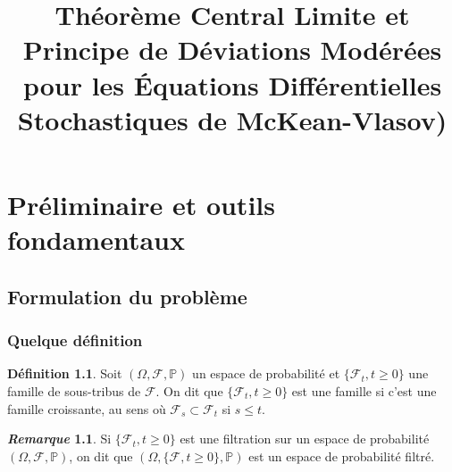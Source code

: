 \documentclass[12pt,a4paper,twoside]{book}%
\title{ \textbf{Théorème Central Limite et Principe de Déviations Modérées pour les Équations Différentielles Stochastiques de McKean-Vlasov)}}
\theoremstyle{definition}
\newtheorem{dfn}{Définition}[section]
\newtheorem{rem}{\textit{Remarque}}[section]
\numberwithin{equation}{section}
\begin{document}
	\tableofcontents
	\newpage
	\chapter{Préliminaire et outils fondamentaux}
\section{Formulation du problème}
\subsection{Quelque définition}
\begin{dfn}
Soit $(\Omega,\mathcal{F},\mathbb{P})$ un espace de probabilité et $\{\mathcal{F}_t,t\geq0\}$ une famille de sous-tribus de $\mathcal{F}$. On dit que $\{\mathcal{F}_t,t\geq0\}$ est une famille si c'est une famille croissante, au sens où $\mathcal{F}_s\subset\mathcal{F}_t$ si $s\leq t$.
\end{dfn}
\begin{rem}
	Si $\{\mathcal{F}_t,t\geq0\}$ est une filtration sur un espace de probabilité $(\Omega,\mathcal{F},\mathbb{P})$, on dit que $(\Omega,\{\mathcal{F},t\geq 0\},\mathbb{P})$ est un espace de probabilité filtré.
\end{rem}
\end{document}
